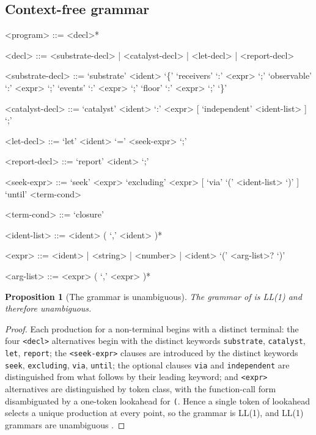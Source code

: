 \documentclass[11pt,a4paper]{article}
\theoremstyle{thmstyle}
\newtheorem{proposition}[theorem]{Proposition}
\theoremstyle{definition}
\theoremstyle{remark}
\begin{document}
\subsection{Context-free grammar}

\begin{grammar}
<program> ::= <decl>*

<decl> ::= <substrate-decl> | <catalyst-decl> | <let-decl> | <report-decl>

<substrate-decl> ::= `substrate' <ident> `\{'
  `receivers' `:' <expr> `;'
  `observable' `:' <expr> `;'
  `events' `:' <expr> `;'
  `floor' `:' <expr> `;' `\}'

<catalyst-decl> ::= `catalyst' <ident> `:' <expr>
  [ `independent' <ident-list> ] `;'

<let-decl> ::= `let' <ident> `=' <seek-expr> `;'

<report-decl> ::= `report' <ident> `;'

<seek-expr> ::= `seek' <expr>
  `excluding' <expr>
  [ `via' `(' <ident-list> `)' ]
  `until' <term-cond>

<term-cond> ::= `closure'

<ident-list> ::= <ident> ( `,' <ident> )*

<expr> ::= <ident> | <string> | <number> | <ident> `(' <arg-list>? `)'

<arg-list> ::= <expr> ( `,' <expr> )*
\end{grammar}

\begin{proposition}[The grammar is unambiguous]
\label{prop:unambiguous}
The grammar of  is LL(1) and therefore unambiguous.
\end{proposition}

\begin{proof}
Each production for a non-terminal begins with a distinct terminal: the four
\texttt{<decl>} alternatives begin with the distinct keywords
\texttt{substrate}, \texttt{catalyst}, \texttt{let}, \texttt{report}; the
\texttt{<seek-expr>} clauses are introduced by the distinct keywords
\texttt{seek}, \texttt{excluding}, \texttt{via}, \texttt{until}; the
optional clauses \texttt{via} and \texttt{independent} are distinguished
from what follows by their leading keyword; and \texttt{<expr>} alternatives
are distinguished by token class, with the function-call form disambiguated
by a one-token lookahead for \texttt{(}. Hence a single token of lookahead
selects a unique production at every point, so the grammar is LL(1), and
LL(1) grammars are unambiguous \citep{aho2006}.
\end{proof}
\end{document}
